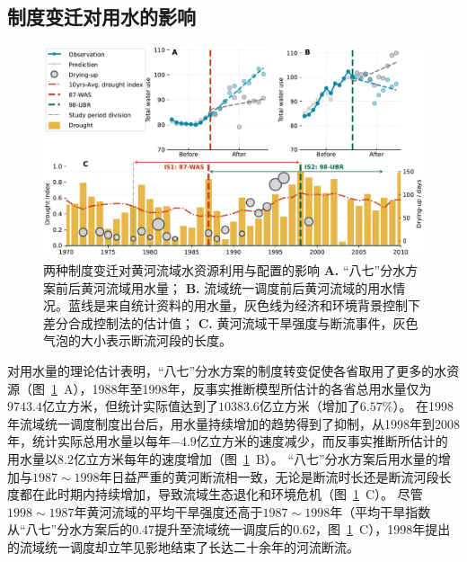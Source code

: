 \subsection{制度变迁对用水的影响}\label{result-2}

\begin{figure}[!htb]
	\centering
	\includegraphics[width=\linewidth]{img/ch5/main_results2.pdf}
	\caption[两种制度变迁对黄河流域水资源利用与配置的影响]{
        两种制度变迁对黄河流域水资源利用与配置的影响
        \textbf{A.} “八七”分水方案前后黄河流域用水量；
        \textbf{B.} 流域统一调度前后黄河流域的用水情况。蓝线是来自统计资料的用水量，灰色线为经济和环境背景控制下差分合成控制法的估计值；
        \textbf{C.} 黄河流域干旱强度与断流事件，灰色气泡的大小表示断流河段的长度。
	}\label{fig:main_results}
\end{figure}

对用水量的理论估计表明，“八七”分水方案的制度转变促使各省取用了更多的水资源（图~\ref{fig:main_results}~A），1988年至1998年，反事实推断模型所估计的各省总用水量仅为$9743.4$亿立方米，但统计实际值达到了$10383.6$亿立方米（增加了$6.57\%$）。
在1998年流域统一调度制度出台后，用水量持续增加的趋势得到了抑制，从1998年到2008年，统计实际总用水量以每年$-4.9$亿立方米的速度减少，而反事实推断所估计的用水量以$8.2$亿立方米每年的速度增加（图~\ref{fig:main_results}~B）。
“八七”分水方案后用水量的增加与$1987 \sim 1998$年日益严重的黄河断流相一致，无论是断流时长还是断流河段长度都在此时期内持续增加，导致流域生态退化和环境危机（图~\ref{fig:main_results}~C）。
尽管$1998 \sim 1987$年黄河流域的平均干旱强度还高于$1987 \sim 1998$年（平均干旱指数从“八七”分水方案后的$0.47$提升至流域统一调度后的$0.62$，图~\ref{fig:main_results}~C），1998年提出的流域统一调度却立竿见影地结束了长达二十余年的河流断流。

